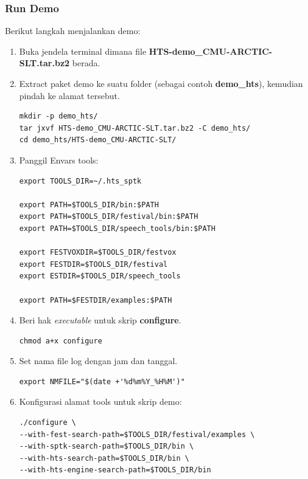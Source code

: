 \documentclass[12pt,]{article}
\begin{document}
	\subsubsection{Run Demo}
	Berikut langkah menjalankan demo:
	
	\begin{enumerate}
		\item Buka jendela terminal dimana file \textbf{HTS-demo\_CMU-ARCTIC-SLT.tar.bz2} berada.
		
		\item Extract paket demo ke suatu folder (sebagai contoh \textbf{demo\_hts}), kemudian pindah ke alamat tersebut.
		\begin{verbatim}
mkdir -p demo_hts/
tar jxvf HTS-demo_CMU-ARCTIC-SLT.tar.bz2 -C demo_hts/
cd demo_hts/HTS-demo_CMU-ARCTIC-SLT/
		\end{verbatim}
		
		\item Panggil Envars tools:
		\begin{verbatim}
export TOOLS_DIR=~/.hts_sptk

export PATH=$TOOLS_DIR/bin:$PATH
export PATH=$TOOLS_DIR/festival/bin:$PATH
export PATH=$TOOLS_DIR/speech_tools/bin:$PATH

export FESTVOXDIR=$TOOLS_DIR/festvox
export FESTDIR=$TOOLS_DIR/festival
export ESTDIR=$TOOLS_DIR/speech_tools

export PATH=$FESTDIR/examples:$PATH
		\end{verbatim}
		
		\newpage
		\item Beri hak \textit{executable} untuk skrip \textbf{configure}.
		\begin{verbatim}
chmod a+x configure
		\end{verbatim}
		
		\item Set nama file log dengan jam dan tanggal.
		\begin{verbatim}
export NMFILE="$(date +'%d%m%Y_%H%M')"
		\end{verbatim}
		
		\item Konfigurasi alamat tools untuk skrip demo:
		\begin{verbatim}
./configure \
--with-fest-search-path=$TOOLS_DIR/festival/examples \
--with-sptk-search-path=$TOOLS_DIR/bin \
--with-hts-search-path=$TOOLS_DIR/bin \
--with-hts-engine-search-path=$TOOLS_DIR/bin
		\end{verbatim}


\end{enumerate}
\end{document}
